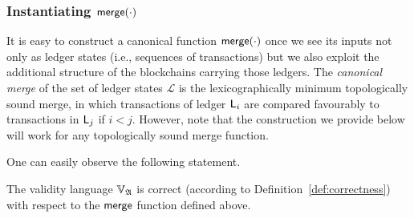 \subsubsection{Instantiating $\merge(\cdot)$}
It is easy to construct a canonical function $\merge(\cdot)$ once we see its inputs not only as
ledger states (i.e., sequences of transactions) but we also exploit the
additional structure of the blockchains carrying those ledgers.
%
%
The \textit{canonical merge} of the set of ledger states
$\mathcal{L}$ is the lexicographically minimum topologically sound merge,
in which transactions of ledger $\LState_i$ are compared favourably to
transactions in $\LState_j$ if $i < j$.
However, note that the construction we provide
below will work for any topologically sound merge function.

\bigskip
\noindent
One can easily observe the following statement.

\begin{proposition}
The validity language $\adalang$
  is correct (according to Definition~\ref{def:correctness})
with respect to the $\merge$ function
defined above.
\end{proposition}

